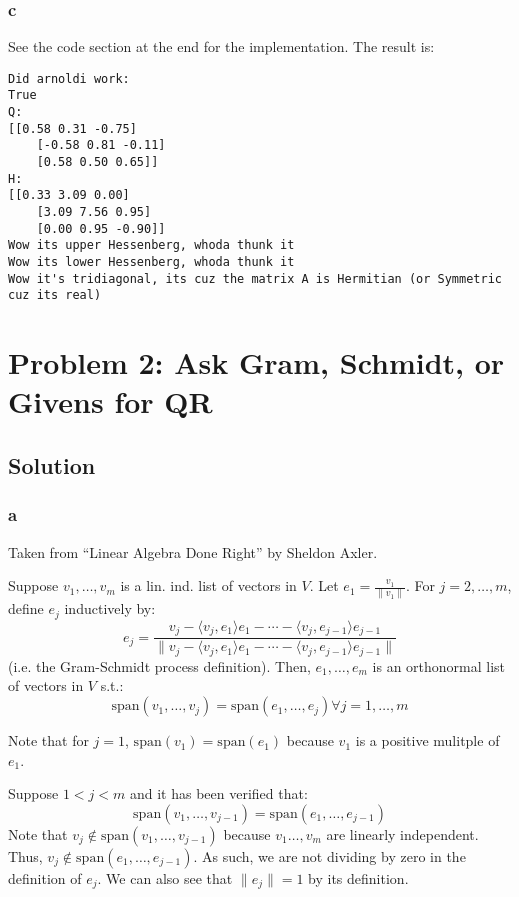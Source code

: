 \documentclass[11pt]{report}
\theoremstyle{definition}
\begin{document}
\subsubsection*{c}
See the code section at the end for the implementation. The result is:

\begin{lstlisting}[basicstyle=\small]
Did arnoldi work:
True
Q:
[[0.58 0.31 -0.75]
	[-0.58 0.81 -0.11]
	[0.58 0.50 0.65]]
H:
[[0.33 3.09 0.00]
	[3.09 7.56 0.95]
	[0.00 0.95 -0.90]]
Wow its upper Hessenberg, whoda thunk it
Wow its lower Hessenberg, whoda thunk it
Wow it's tridiagonal, its cuz the matrix A is Hermitian (or Symmetric cuz its real)
\end{lstlisting}

\newpage

\section*{Problem 2: Ask Gram, Schmidt, or Givens for QR}

\subsection*{Solution}
\subsubsection*{a}
Taken from ``Linear Algebra Done Right'' by Sheldon Axler.

Suppose $v_1,\ldots,v_m$ is a lin. ind. list of vectors in $V$. Let $e_1=\frac{v_1}{\|v_1\|}$. For
$j=2,\ldots,m$, define $e_j$ inductively by:
\[
	e_j = \frac{
	v_j-\langle v_j,e_1\rangle e_1-\cdots -\langle v_j,e_{j-1}\rangle e_{j-1}
	}{
	\|v_j-\langle v_j,e_1\rangle e_1-\cdots -\langle v_j,e_{j-1}\rangle e_{j-1}\|
	}
\]
(i.e. the Gram-Schmidt process definition). Then, $e_1,\ldots,e_m$ is an orthonormal list of vectors in $V$ s.t.:
\[\mathrm{span}(v_1,\ldots,v_j)=\mathrm{span}(e_1,\ldots,e_j)\forall j=1,\ldots,m\]


Note that for $j=1$, $\mathrm{span}(v_1)=\mathrm{span}(e_1)$ because $v_1$ is a positive mulitple of $e_1$.

Suppose $1<j<m$ and it has been verified that:
\[\mathrm{span}(v_1,\ldots,v_{j-1})=\mathrm{span}(e_1,\ldots,e_{j-1})\]
Note that $v_j\notin \mathrm{span}(v_1,\ldots,v_{j-1})$ because $v_1\ldots,v_m$ are linearly independent.
Thus, $v_j\notin \mathrm{span}(e_1,\ldots,e_{j-1})$. As such, we are not dividing by zero in the definition of $e_j$.
We can also see that $\|e_j\|=1$ by its definition.
\end{document}
